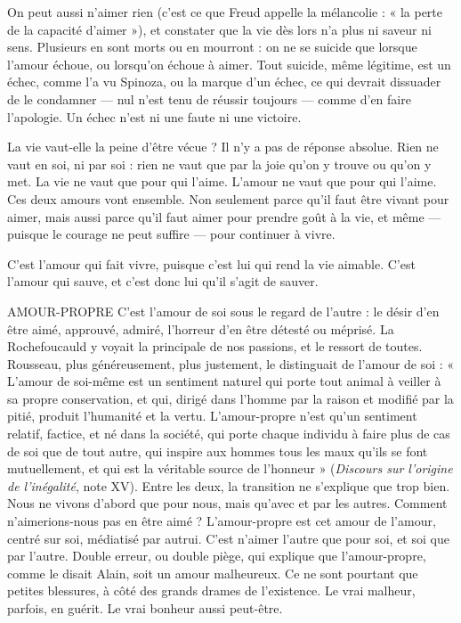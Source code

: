 On peut aussi n’aimer rien (c’est ce que Freud appelle la mélancolie : « la
perte de la capacité d’aimer »), et constater que la vie dès lors n’a plus ni saveur
ni sens. Plusieurs en sont morts ou en mourront : on ne se suicide que lorsque
l'amour échoue, ou lorsqu'on échoue à aimer. Tout suicide, même légitime, est
un échec, comme l’a vu Spinoza, ou la marque d’un échec, ce qui devrait dissuader
de le condamner — nul n’est tenu de réussir toujours — comme d’en faire
l'apologie. Un échec n’est ni une faute ni une victoire.

La vie vaut-elle la peine d’être vécue ? Il n’y a pas de réponse absolue. Rien
ne vaut en soi, ni par soi : rien ne vaut que par la joie qu’on y trouve ou qu’on
y met. La vie ne vaut que pour qui l’aime. L'amour ne vaut que pour qui
l'aime. Ces deux amours vont ensemble. Non seulement parce qu’il faut être
vivant pour aimer, mais aussi parce qu’il faut aimer pour prendre goût à la vie,
et même — puisque le courage ne peut suffire — pour continuer à vivre.

C’est l'amour qui fait vivre, puisque c’est lui qui rend la vie aimable. C’est
l'amour qui sauve, et c’est donc lui qu’il s’agit de sauver.

AMOUR-PROPRE C'est l’amour de soi sous le regard de l’autre : le désir d’en
être aimé, approuvé, admiré, l’horreur d’en être détesté
ou méprisé. La Rochefoucauld y voyait la principale de nos passions, et le ressort
de toutes. Rousseau, plus généreusement, plus justement, le distinguait de
l'amour de soi : « L'amour de soi-même est un sentiment naturel qui porte tout
animal à veiller à sa propre conservation, et qui, dirigé dans l’homme par la
raison et modifié par la pitié, produit l'humanité et la vertu. L’amour-propre
n’est qu’un sentiment relatif, factice, et né dans la société, qui porte chaque
individu à faire plus de cas de soi que de tout autre, qui inspire aux hommes
tous les maux qu’ils se font mutuellement, et qui est la véritable source de
l’honneur » ({\it Discours sur l'origine de l'inégalité}, note XV). Entre les deux, la
transition ne s’explique que trop bien. Nous ne vivons d’abord que pour nous,
mais qu'avec et par les autres. Comment n’aimerions-nous pas en être aimé ?
L’amour-propre est cet amour de l’amour, centré sur soi, médiatisé par autrui.
C’est n’aimer l’autre que pour soi, et soi que par l’autre. Double erreur, ou
double piège, qui explique que l’amour-propre, comme le disait Alain, soit un
amour malheureux. Ce ne sont pourtant que petites blessures, à côté des grands
drames de l'existence. Le vrai malheur, parfois, en guérit. Le vrai bonheur aussi
peut-être.

